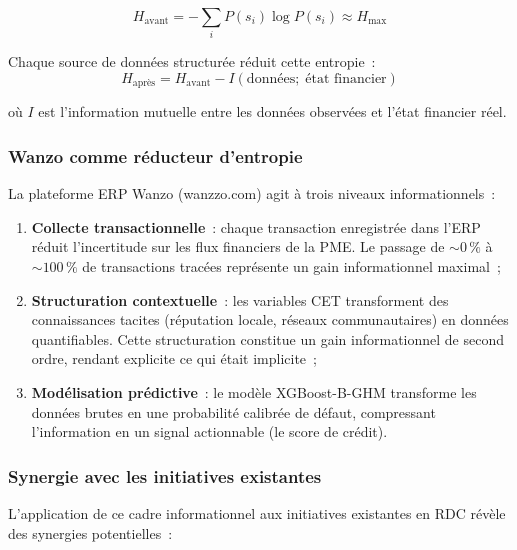 \documentclass[12pt, a4paper, twocolumn]{article}
\begin{document}
\begin{equation}
\label{eq:entropy_before}
  H_{\text{avant}} = -\sum_{i} P(s_i) \log P(s_i) \approx H_{\text{max}}
\end{equation}

Chaque source de données structurée réduit cette entropie~:
\begin{equation}
\label{eq:entropy_after}
  H_{\text{après}} = H_{\text{avant}} - I(\text{données};\;\text{état financier})
\end{equation}

\noindent où $I$ est l'information mutuelle entre les données observées et l'état financier réel.

\subsubsection{Wanzo comme réducteur d'entropie}
\label{subsubsec:wanzo_entropie}

La plateforme ERP Wanzo (wanzzo.com) agit à trois niveaux informationnels~:

\begin{enumerate}[leftmargin=*]
  \item \textbf{Collecte transactionnelle}~: chaque transaction enregistrée dans l'ERP réduit l'incertitude sur les flux financiers de la PME. Le passage de ${\sim}0\,\%$ à ${\sim}100\,\%$ de transactions tracées représente un gain informationnel maximal~;
  \item \textbf{Structuration contextuelle}~: les variables CET transforment des connaissances tacites (réputation locale, réseaux communautaires) en données quantifiables. Cette structuration constitue un gain informationnel de second ordre, rendant explicite ce qui était implicite~;
  \item \textbf{Modélisation prédictive}~: le modèle XGBoost-B-GHM transforme les données brutes en une probabilité calibrée de défaut, compressant l'information en un signal actionnable (le score de crédit).
\end{enumerate}

\subsubsection{Synergie avec les initiatives existantes}
\label{subsubsec:synergies}

L'application de ce cadre informationnel aux initiatives existantes en RDC révèle des synergies potentielles~:
\end{document}
